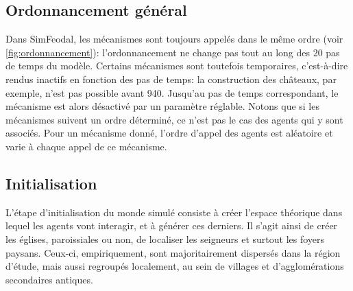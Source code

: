 \subsection*{Ordonnancement général \label{meca-ordonancement}}



\begin{tcolorbox}[breakable,left=0pt,right=0pt,top=0pt,bottom=0pt,
	colback=gray!15,colframe=gray!15,width=\dimexpr\textwidth\relax, 
	enlarge left by=0mm, boxsep=5pt,arc=0pt,outer arc=0pt]
	
Dans SimFeodal, les mécanismes sont toujours appelés dans le même ordre (voir \cref{fig:ordonnancement}): l'ordonnancement ne change pas tout au long des 20 pas de temps du modèle.
Certains mécanismes sont toutefois temporaires, c'est-à-dire rendus inactifs en fonction des pas de temps: la construction des châteaux, par exemple, n'est pas possible avant 940.
Jusqu'au pas de temps correspondant, le mécanisme est alors désactivé par un paramètre réglable.
Notons que si les mécanismes suivent un ordre déterminé, ce n'est pas le cas des agents qui y sont associés.
Pour un mécanisme donné, l'ordre d'appel des agents est aléatoire et varie à chaque appel de ce mécanisme.
\end{tcolorbox}


\subsection{Initialisation \label{meca-init}}

L'étape d'initialisation du \og monde\fg{} simulé consiste à créer l'espace théorique dans lequel les agents vont interagir, et à générer ces derniers.
Il s'agit ainsi de créer les églises, paroissiales ou non, de localiser les seigneurs et surtout les foyers paysans.
Ceux-ci, empiriquement, sont majoritairement dispersés dans la région d'étude, mais aussi regroupés localement, au sein de villages et d'agglomérations secondaires antiques.

